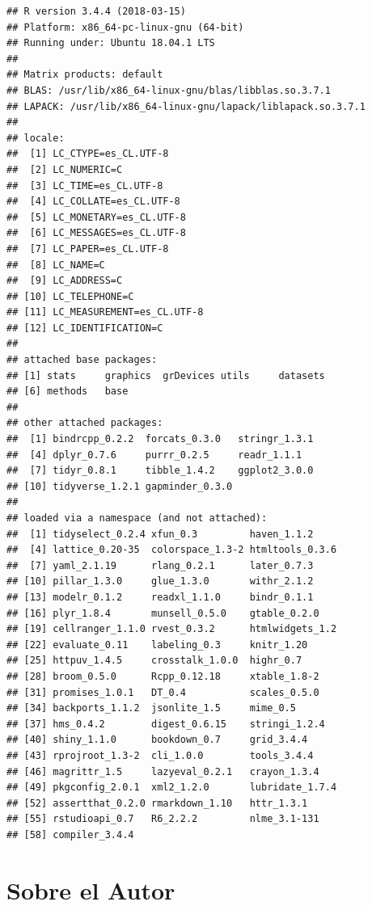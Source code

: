 \documentclass[12pt,]{book}
\begin{document}
\begin{verbatim}
## R version 3.4.4 (2018-03-15)
## Platform: x86_64-pc-linux-gnu (64-bit)
## Running under: Ubuntu 18.04.1 LTS
## 
## Matrix products: default
## BLAS: /usr/lib/x86_64-linux-gnu/blas/libblas.so.3.7.1
## LAPACK: /usr/lib/x86_64-linux-gnu/lapack/liblapack.so.3.7.1
## 
## locale:
##  [1] LC_CTYPE=es_CL.UTF-8      
##  [2] LC_NUMERIC=C              
##  [3] LC_TIME=es_CL.UTF-8       
##  [4] LC_COLLATE=es_CL.UTF-8    
##  [5] LC_MONETARY=es_CL.UTF-8   
##  [6] LC_MESSAGES=es_CL.UTF-8   
##  [7] LC_PAPER=es_CL.UTF-8      
##  [8] LC_NAME=C                 
##  [9] LC_ADDRESS=C              
## [10] LC_TELEPHONE=C            
## [11] LC_MEASUREMENT=es_CL.UTF-8
## [12] LC_IDENTIFICATION=C       
## 
## attached base packages:
## [1] stats     graphics  grDevices utils     datasets 
## [6] methods   base     
## 
## other attached packages:
##  [1] bindrcpp_0.2.2  forcats_0.3.0   stringr_1.3.1  
##  [4] dplyr_0.7.6     purrr_0.2.5     readr_1.1.1    
##  [7] tidyr_0.8.1     tibble_1.4.2    ggplot2_3.0.0  
## [10] tidyverse_1.2.1 gapminder_0.3.0
## 
## loaded via a namespace (and not attached):
##  [1] tidyselect_0.2.4 xfun_0.3         haven_1.1.2     
##  [4] lattice_0.20-35  colorspace_1.3-2 htmltools_0.3.6 
##  [7] yaml_2.1.19      rlang_0.2.1      later_0.7.3     
## [10] pillar_1.3.0     glue_1.3.0       withr_2.1.2     
## [13] modelr_0.1.2     readxl_1.1.0     bindr_0.1.1     
## [16] plyr_1.8.4       munsell_0.5.0    gtable_0.2.0    
## [19] cellranger_1.1.0 rvest_0.3.2      htmlwidgets_1.2 
## [22] evaluate_0.11    labeling_0.3     knitr_1.20      
## [25] httpuv_1.4.5     crosstalk_1.0.0  highr_0.7       
## [28] broom_0.5.0      Rcpp_0.12.18     xtable_1.8-2    
## [31] promises_1.0.1   DT_0.4           scales_0.5.0    
## [34] backports_1.1.2  jsonlite_1.5     mime_0.5        
## [37] hms_0.4.2        digest_0.6.15    stringi_1.2.4   
## [40] shiny_1.1.0      bookdown_0.7     grid_3.4.4      
## [43] rprojroot_1.3-2  cli_1.0.0        tools_3.4.4     
## [46] magrittr_1.5     lazyeval_0.2.1   crayon_1.3.4    
## [49] pkgconfig_2.0.1  xml2_1.2.0       lubridate_1.7.4 
## [52] assertthat_0.2.0 rmarkdown_1.10   httr_1.3.1      
## [55] rstudioapi_0.7   R6_2.2.2         nlme_3.1-131    
## [58] compiler_3.4.4
\end{verbatim}

\chapter*{Sobre el Autor}\label{sobre-el-autor}
\end{document}
